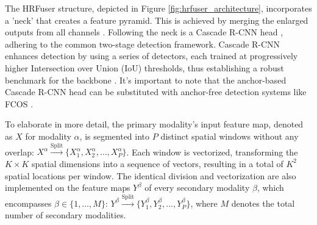 \documentclass[report.tex]{subfiles}
\begin{document}
    The HRFuser structure, depicted in Figure \ref{fig:hrfuser_architecture}, incorporates a 'neck' that creates a feature pyramid. This is achieved by merging the enlarged outputs from all channels \cite{wang2020hrnet}. Following the neck is a Cascade R-CNN head \cite{cai2018cascade}, adhering to the common two-stage detection framework. Cascade R-CNN enhances detection by using a series of detectors, each trained at progressively higher Intersection over Union (IoU) thresholds, thus establishing a robust benchmark for the backbone \cite{broedermann2022hrfuser}. It's important to note that the anchor-based Cascade R-CNN head can be substituted with anchor-free detection systems like FCOS \cite{tian2019fcos}.



    To elaborate in more detail, the primary modality's input feature map, denoted as \( X \) for modality \( \alpha \), is segmented into \( P \) distinct spatial windows without any overlap: \( X^\alpha \xrightarrow{\text{Split}} \{X^\alpha_1, X^\alpha_2, \ldots, X^\alpha_P\} \). Each window is vectorized, transforming the \( K \times K \) spatial dimensions into a sequence of vectors, resulting in a total of \( K^2 \) spatial locations per window. The identical division and vectorization are also implemented on the feature maps \( Y^\beta \) of every secondary modality \( \beta \), which encompasses \( \beta \in \{1, \ldots, M\} \): \( Y^\beta \xrightarrow{\text{Split}} \{Y^\beta_1, Y^\beta_2, \ldots, Y^\beta_P\} \), where \( M \) denotes the total number of secondary modalities.
\end{document}
